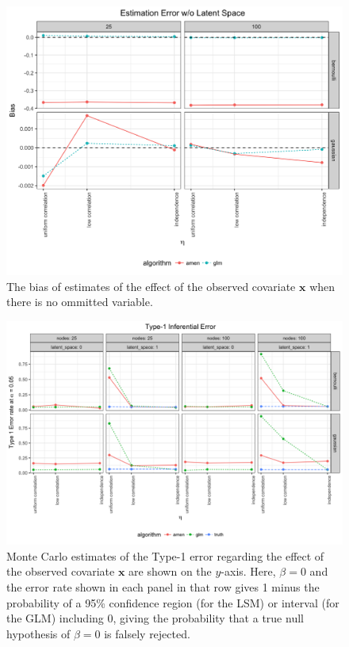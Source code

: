 \documentclass[11pt]{article}
\begin{document}
\begin{figure}
\includegraphics[width=\textwidth]{figures/estimation_nls_amen.png}
\caption{The bias of estimates of the effect of the observed covariate $\mathbf{x}$ when there is no ommitted variable.
\label{fig:estimation_nls_amen}}
\end{figure}

\begin{figure}
\includegraphics[width=\textwidth]{figures/inference_type_1_amen.png}
\caption{Monte Carlo estimates of the Type-1 error regarding the effect of the observed covariate $\mathbf{x}$ are shown on the $y$-axis. Here, $\beta = 0$ and the error rate shown in each panel in that row gives 1 minus the probability of a 95\% confidence region (for the LSM) or interval (for the GLM) including $0$, giving the probability that a true null hypothesis of $\beta = 0$ is falsely rejected. \label{fig:inference_type_1_amen}}
\end{figure}
\end{document}
